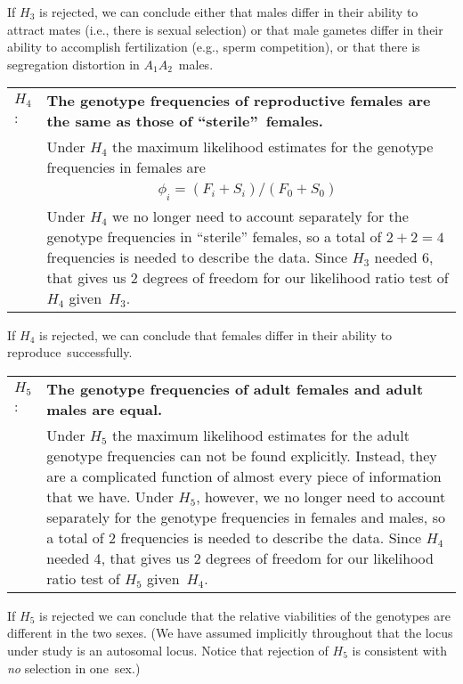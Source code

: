 \noindent If $H_3$ is rejected, we can conclude either that males
differ in their ability to attract mates (i.e., there is sexual
selection) or that male gametes differ in their ability to accomplish
fertilization (e.g., sperm competition), or that there is segregation
distortion in $A_{1}A_{2}$~males.

\medskip

\noindent\begin{tabular}{@{}lp{6.0in}}
$H_{4}$: & \bf The genotype frequencies of reproductive females are
the same as those of ``sterile''~females.\\
& Under $H_4$ the maximum likelihood estimates for the
genotype frequencies in females are \\
& $$\phi_{i} = (F_{i}+S_{i})/(F_{0}+S_{0})$$ \\
& Under $H_4$ we no longer need to account separately for the genotype
frequencies in ``sterile'' females, so a total of $2+2=4$ frequencies
is needed to describe the data.  Since $H_3$ needed 6, that gives us
2 degrees of freedom for our likelihood ratio test of $H_4$
given~$H_3$.\\
\end{tabular}

\noindent If $H_4$ is rejected, we can conclude that females differ in
their ability to reproduce~successfully.

\medskip

\noindent\begin{tabular}{@{}lp{6.0in}}
$H_{5}$: & \bf The genotype frequencies of adult females and adult
males are equal.\\
& Under $H_5$ the maximum likelihood estimates for the adult
genotype frequencies can not be found explicitly.  Instead, they are
a complicated function of almost every piece of information that we
have.  Under $H_5$, however, we no longer need to account separately
for the genotype frequencies in females and males, so a total of $2$ 
frequencies is needed to describe the data.  Since $H_4$ needed 4,
that gives us 2 degrees of freedom for our likelihood ratio test of
$H_5$ given~$H_4$.\\
\end{tabular}

\noindent If $H_5$ is rejected we can conclude that the relative
viabilities of the genotypes are different in the two sexes.  (We have
assumed implicitly throughout that the locus under study is an
autosomal locus.  Notice that rejection of $H_5$ is consistent with
{\it no\/} selection in one~sex.)

